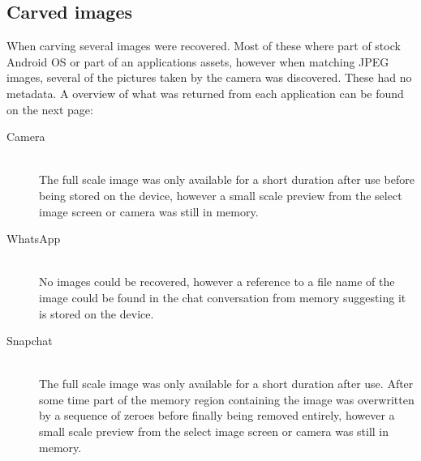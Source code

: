 \subsection{Carved images}
When carving several images were recovered. Most of these where part of stock Android OS or part of an applications assets, however when matching JPEG images, several of the pictures taken by the camera was discovered. These had no metadata. A overview of what was returned from each application can be found on the next page:\\
\begin{description}
\item[Camera]\hfill\\
The full scale image was only available for a short duration after use before being stored on the device, however a small scale preview from the select image screen or camera was still in memory.
\item[WhatsApp]\hfill\\
No images could be recovered, however a reference to a file name of the image could be found in the chat conversation from memory suggesting it is stored on the device.
\item[Snapchat]\hfill\\
The full scale image was only available for a short duration after use. After some time part of the memory region containing the image was overwritten by a sequence of zeroes before finally being removed entirely, however a small scale preview from the select image screen or camera was still in memory.
\end{description}